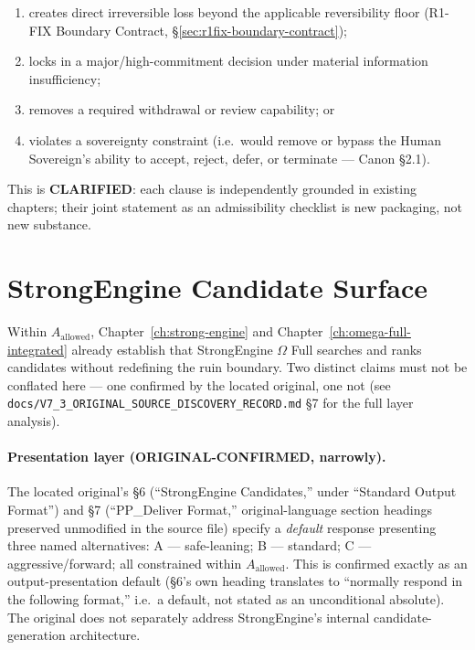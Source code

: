 \begin{enumerate}
\item creates direct irreversible loss beyond the applicable
reversibility floor (R1-FIX Boundary Contract,
\S\ref{sec:r1fix-boundary-contract});
\item locks in a major/high-commitment decision under material
information insufficiency;
\item removes a required withdrawal or review capability; or
\item violates a sovereignty constraint (i.e.\ would remove or bypass
the Human Sovereign's ability to accept, reject, defer, or terminate
--- Canon \S2.1).
\end{enumerate}

This is \textbf{CLARIFIED}: each clause is independently grounded in
existing chapters; their joint statement as an admissibility checklist
is new packaging, not new substance.

\section{StrongEngine Candidate Surface}
\label{sec:v73-strongengine-surface}

Within $A_{\mathrm{allowed}}$, Chapter~\ref{ch:strong-engine} and
Chapter~\ref{ch:omega-full-integrated} already establish that StrongEngine
$\Omega$ Full searches and ranks candidates without redefining the
ruin boundary. Two distinct claims must not be conflated here --- one
confirmed by the located original, one not (see
\texttt{docs/V7\_3\_ORIGINAL\_SOURCE\_DISCOVERY\_RECORD.md} \S7 for the
full layer analysis).

\paragraph{Presentation layer (\textbf{ORIGINAL-CONFIRMED}, narrowly).}
The located original's \S6 (``StrongEngine Candidates,'' under
``Standard Output Format'') and \S7 (``PP\_Deliver Format,''
original-language section headings preserved unmodified in the source
file) specify a \emph{default} response presenting three named
alternatives: A --- safe-leaning; B --- standard; C ---
aggressive/forward; all constrained within $A_{\mathrm{allowed}}$. This
is confirmed exactly as an output-presentation default (\S6's own
heading translates to ``normally respond in the following format,''
i.e.\ a default, not stated as an unconditional absolute). The original
does not separately address StrongEngine's internal candidate-
generation architecture.

